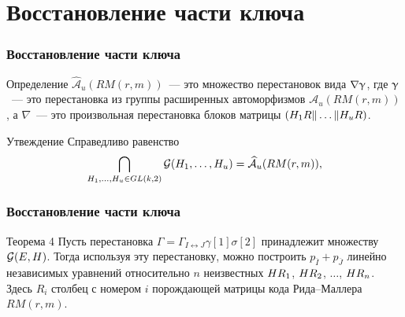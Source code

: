 
\section{Восстановление части ключа}

\begin{frame}
\frametitle{Восстановление части ключа}
\begin{block}{Определение}
 $\widehat{\mathcal A}_u(RM(r,m))$~--- это множество перестановок вида $\nabla {\ensuremath{\upgamma}}$, где ${\upgamma}$~--- это перестановка из группы расширенных автоморфизмов $\mathcal A_u(RM(r,m))$, а $\nabla$~--- это произвольная перестановка блоков матрицы $({H}_1{R}\|\ldots\|{H}_u{R})$.
\end{block}
\begin{block}{Утвеждение}
Справедливо равенство
\begin{equation*}
\bigcap_{{H}_1,\ldots,{H}_u\in GL(k,2)}\mathcal G({H}_1,\ldots,{H}_u)=\widehat{\mathcal A}_u(RM(r,m)),
\end{equation*}
\end{block}
\end{frame}


\begin{frame}
\frametitle{Восстановление части ключа}
\begin{block}{Теорема 4}
Пусть перестановка $\Gamma=\Gamma_{I\leftrightarrow J}\gamma[1]\sigma[2]$ принадлежит множеству $\mathcal G({E},{H})$.  Тогда используя эту перестановку, можно построить $p_{\overline{I}}+p_{\overline{J}}$ линейно независимых уравнений относительно $n$ неизвестных ${H}R_{1}$, ${H}R_{2}$, $\ldots$, ${H}R_{n}$. Здесь $R_i$ столбец с номером $i$ порождающей матрицы кода Рида--Маллера $RM(r,m)$.
\end{block}
\end{frame}
